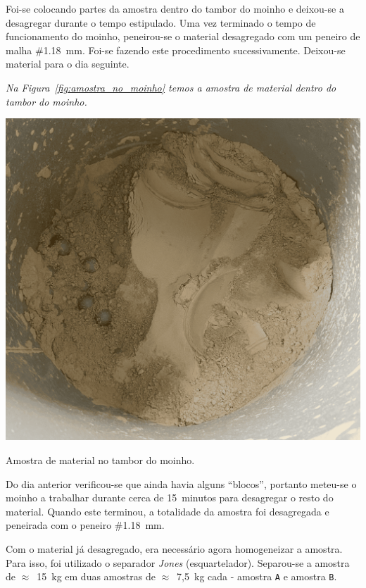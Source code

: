 Foi-se colocando partes da amostra dentro do tambor do moinho e deixou-se a desagregar durante o tempo estipulado.
Uma vez terminado o tempo de funcionamento do moinho, peneirou-se o material desagregado com um peneiro de malha \#1.18~mm.
Foi-se fazendo este procedimento sucessivamente.
Deixou-se material para o dia seguinte.

\hrulefill



\textit{Na Figura~\ref{fig:amostra_no_moinho} temos a amostra de material dentro do tambor do moinho.}

\begin{marginfigure}
    \includegraphics[width=\linewidth]{figures/amostra_no_moinho}
    \caption{Amostra de material no tambor do moinho.}
    \label{fig:amostra_no_moinho}
\end{marginfigure}

Do dia anterior verificou-se que ainda havia alguns ``blocos'', portanto meteu-se o moinho a trabalhar durante cerca de 15~minutos para desagregar o resto do material.
Quando este terminou, a totalidade da amostra foi desagregada e peneirada com o peneiro \#1.18~mm.

Com o material já desagregado, era necessário agora homogeneizar a amostra.
Para isso, foi utilizado o separador \emph{Jones} (esquartelador).
Separou-se a amostra de $\approx$~15~kg em duas amostras de $\approx$~7,5~kg cada - amostra \texttt{A} e amostra \texttt{B}\@.

